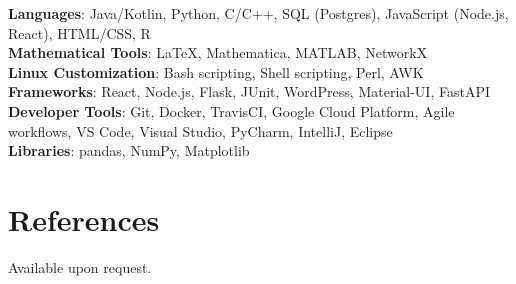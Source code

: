   \textbf{Languages}: Java/Kotlin, Python, C/C++, SQL (Postgres), JavaScript (Node.js, React), HTML/CSS, R\\
  \textbf{Mathematical Tools}: LaTeX, Mathematica, MATLAB, NetworkX\\
  \textbf{Linux Customization}: Bash scripting, Shell scripting, Perl, AWK\\
  \textbf{Frameworks}: React, Node.js, Flask, JUnit, WordPress, Material-UI, FastAPI\\
  \textbf{Developer Tools}: Git, Docker, TravisCI, Google Cloud Platform, Agile workflows, VS Code, Visual Studio, PyCharm, IntelliJ, Eclipse\\
  \textbf{Libraries}: pandas, NumPy, Matplotlib




\section*{References}
Available upon request.